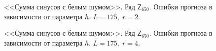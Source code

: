 \documentclass[specialist,
               substylefile = spbu.rtx,
               subf,href,colorlinks=true, 12p]{disser}
\begin{document}
\begin{figure}[H]
	\captionsetup{justification=centering}
	\caption{<<Сумма синусов с белым шумом>>. Ряд $\mathsf{Z}_{650}$. Ошибки прогноза в зависимости от параметра $h$. $L = 175, \; r = 2$.}
	\label{edsinr_r2.h}
\end{figure}

\begin{figure}[H]
	\captionsetup{justification=centering}
	\caption{<<Сумма синусов с белым шумом>>. Ряд $\mathsf{Z}_{650}$. Ошибки прогноза в зависимости от параметра $h$. $L = 175, \; r = 4$.}
	\label{edsinr_r4.h}
\end{figure}
\end{document}
